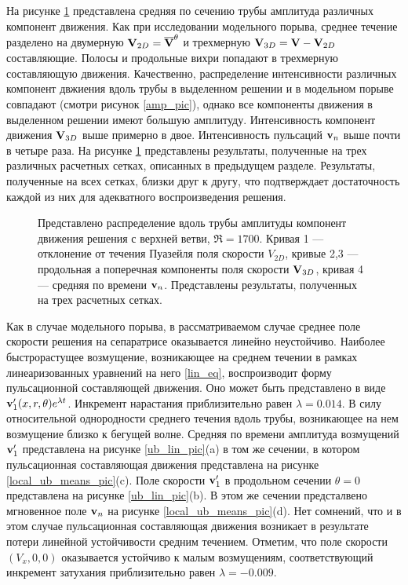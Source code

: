 На рисунке \ref{amp_ub_pic} представлена средняя по сечению трубы амплитуда различных компонент движения. Как при исследовании модельного порыва, среднее течение разделено на двумерную $\mathbf{V}_{2D} = \overline{\mathbf{V}}^{\theta}$ и трехмерную $\mathbf{V}_{3D} = \mathbf{V} - \mathbf{V}_{2D}$ составляющие. Полосы и продольные вихри попадают в трехмерную составляющую движения. Качественно, распределение интенсивности различных компонент двжиения вдоль трубы в выделенном решении и в модельном порыве совпадают (смотри рисунок \ref{amp_pic}), однако все компоненты движения в выделенном решении имеют большую амплитуду. Интенсивность компонент движения $\mathbf{V}_{3D}$ выше примерно в двое. Интенсивность пульсаций $\mathbf{v}_n$ выше почти в четыре раза. На рисунке \ref{amp_ub_pic} представлены результаты, полученные на трех различных расчетных сетках, описанных в предыдущем разделе. Результаты, полученные на всех сетках, близки друг к другу, что подтверждает достаточность каждой из них для адекватного воспроизведения решения. 


\begin{figure}
\caption{Представлено распределение вдоль трубы амплитуды компонент движения решения с верхней ветви, $\Re = 1700$. Кривая 1 --- отклонение от течения Пуазейля поля скорости $V_{2D}$, кривые 2,3 --- продольная а поперечная компоненты поля скорости $\mathbf{V}_{3D}$, кривая 4 --- средняя по времени $\mathbf{v}_n$. Представлены результаты, полученных на трех расчетных сетках.}
\label{amp_ub_pic}
\end{figure}

Как в случае модельного порыва, в рассматриваемом случае среднее поле скорости решения на сепаратрисе оказывается линейно неустойчиво. Наиболее быстрорастущее возмущение, возникающее на среднем течении в рамках линеаризованных уравнений на него \eqref{lin_eq}, воспроизводит форму пульсационной составляющей движения. Оно может быть представлено в виде $\mathbf{v}'_1(x,r,\theta) e^{\lambda t}$. Инкремент нарастания приблизительно равен $\lambda = 0.014$. В силу относительной однородности среднего течения вдоль трубы, возникающее на нем возмущение близко к бегущей волне. Средняя по времени амплитуда возмущений $\mathbf{v}'_1$ представлена на рисунке \ref{ub_lin_pic}(a) в том же сечении, в котором пульсационная составляющая движения представлена на рисунке \ref{local_ub_means_pic}(c). Поле скорости $\mathbf{v}'_1$ в продольном сечении $\theta = 0$ представлена на рисунке \ref{ub_lin_pic}(b). В этом же сечении предсталвено мгновенное поле $\mathbf{v}_n$ на рисунке \ref{local_ub_means_pic}(d). Нет сомнений, что и в этом случае пульсационная составляющая движения возникает в результате потери линейной устойчивости средним течением. Отметим, что поле скорости $(V_x, 0, 0)$ оказывается устойчиво к малым возмущениям, соответствующий инкремент затухания приблизительно равен $\lambda = -0.009$. 

